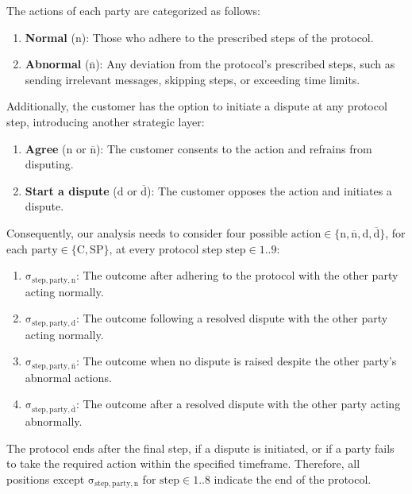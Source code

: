\documentclass[pdftex,twocolumn,epjc3]{svjour3}
\newcommand{\normal}{\mathrm{n}}
\newcommand{\dispute}{\mathrm{d}}
\newcommand{\abnormal}{\overline{\mathrm{n}}}
\newcommand{\abdispute}{\overline{\mathrm{d}}}
\begin{document}
The actions of each party are categorized as follows:

\begin{enumerate}
\item \textbf{Normal} ($\normal{}$): Those who adhere to the prescribed steps of the protocol.
\item \textbf{Abnormal} ($\abnormal{}$): Any deviation from the protocol's prescribed steps, such as sending irrelevant messages, skipping steps, or exceeding time limits.
\end{enumerate}

Additionally, the customer has the option to initiate a dispute at any protocol step, introducing another strategic layer:

\begin{enumerate}
\def\labelenumi{\arabic{enumi}.}
\item \textbf{Agree} ($\normal{}$ or $\abnormal{}$): The customer consents to the action and refrains from disputing.
\item \textbf{Start a dispute} ($\dispute{}$ or $\abdispute{}$): The customer opposes the action and initiates a dispute.
\end{enumerate}

\begin{sloppypar}
Consequently, our analysis needs to consider four possible $\mathrm{action} \in \{ \normal{}, \abnormal{}, \dispute{}, \abdispute{} \}$, for each $\mathrm{party \in \{C, SP\} }$, at every protocol step $\mathrm{step \in 1..9}$:
\end{sloppypar}

\begin{enumerate}
\item $\mathrm{\sigma_{step,party,\normal{}}}$: The outcome after adhering to the protocol with the other party acting normally.
\item $\mathrm{\sigma_{step,party,\dispute{}}}$: The outcome following a resolved dispute with the other party acting normally.
\item $\mathrm{\sigma_{step,party,\abnormal{}}}$: The outcome when no dispute is raised despite the other party's abnormal actions.
\item $\mathrm{\sigma_{step,party,\abdispute{}}}$: The outcome after a resolved dispute with the other party acting abnormally.
\end{enumerate}

\begin{sloppypar}
The protocol ends after the final step, if a dispute is initiated, or if a party fails to take the required action within the specified timeframe. Therefore, all positions except $\mathrm{\sigma_{step, party, n}}$ for $\mathrm{step} \in 1..8$ indicate the end of the protocol.
\end{sloppypar}
\end{document}
